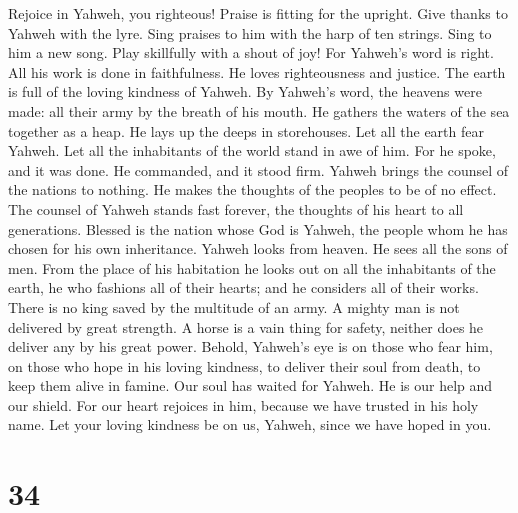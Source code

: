  Rejoice in Yahweh, you righteous! Praise is fitting for the
upright.  Give thanks to Yahweh with the lyre. Sing praises
to him with the harp of ten strings.  Sing to him a new
song. Play skillfully with a shout of joy!  For Yahweh's
word is right. All his work is done in faithfulness.  He
loves righteousness and justice. The earth is full of the loving
kindness of Yahweh.  By Yahweh's word, the heavens were
made: all their army by the breath of his mouth.  He gathers
the waters of the sea together as a heap. He lays up the deeps in
storehouses.  Let all the earth fear Yahweh. Let all the
inhabitants of the world stand in awe of him.  For he spoke,
and it was done. He commanded, and it stood firm.  Yahweh
brings the counsel of the nations to nothing. He makes the thoughts of
the peoples to be of no effect.  The counsel of Yahweh
stands fast forever, the thoughts of his heart to all generations.
 Blessed is the nation whose God is Yahweh, the people whom
he has chosen for his own inheritance.  Yahweh looks from
heaven. He sees all the sons of men.  From the place of his
habitation he looks out on all the inhabitants of the earth,
 he who fashions all of their hearts; and he considers all
of their works.  There is no king saved by the multitude of
an army. A mighty man is not delivered by great strength. 
A horse is a vain thing for safety, neither does he deliver any by his
great power.  Behold, Yahweh's eye is on those who fear
him, on those who hope in his loving kindness,  to deliver
their soul from death, to keep them alive in famine.  Our
soul has waited for Yahweh. He is our help and our shield. 
For our heart rejoices in him, because we have trusted in his holy name.
 Let your loving kindness be on us, Yahweh, since we have
hoped in you.

\hypertarget{section-33}{%
\section{34}\label{section-33}}

